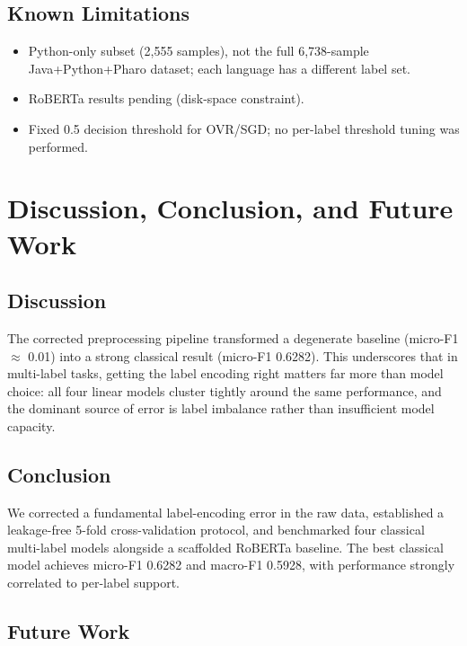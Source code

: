 \documentclass[11pt,a4paper]{article}
\begin{document}
\subsection{Known Limitations}

\begin{itemize}[nosep]
    \item Python-only subset (2{,}555 samples), not the full 6{,}738-sample
          Java+Python+Pharo dataset; each language has a different label set.
    \item RoBERTa results pending (disk-space constraint).
    \item Fixed 0.5 decision threshold for OVR/SGD; no per-label threshold
          tuning was performed.
\end{itemize}

\section{Discussion, Conclusion, and Future Work}
\label{sec:conclusion}

\subsection{Discussion}

The corrected preprocessing pipeline transformed a degenerate baseline
(micro-F1 $\approx$ 0.01) into a strong classical result (micro-F1 0.6282). This
underscores that in multi-label tasks, getting the label encoding right matters
far more than model choice: all four linear models cluster tightly around the
same performance, and the dominant source of error is label imbalance rather
than insufficient model capacity.

\subsection{Conclusion}

We corrected a fundamental label-encoding error in the raw data, established a
leakage-free 5-fold cross-validation protocol, and benchmarked four classical
multi-label models alongside a scaffolded RoBERTa baseline. The best classical
model achieves micro-F1 0.6282 and macro-F1 0.5928, with performance strongly
correlated to per-label support.

\subsection{Future Work}
\end{document}
